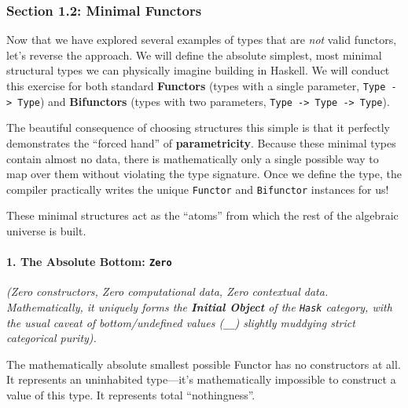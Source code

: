 \documentclass[
]{article}
\begin{document}
\subsubsection{Section 1.2: Minimal
Functors}\label{section-1.2-minimal-functors}

Now that we have explored several examples of types that are \emph{not}
valid functors, let's reverse the approach. We will define the absolute
simplest, most minimal structural types we can physically imagine
building in Haskell. We will conduct this exercise for both standard
\textbf{Functors} (types with a single parameter,
\texttt{Type\ -\textgreater{}\ Type}) and \textbf{Bifunctors} (types
with two parameters,
\texttt{Type\ -\textgreater{}\ Type\ -\textgreater{}\ Type}).

The beautiful consequence of choosing structures this simple is that it
perfectly demonstrates the ``forced hand'' of \textbf{parametricity}.
Because these minimal types contain almost no data, there is
mathematically only a single possible way to map over them without
violating the type signature. Once we define the type, the compiler
practically writes the unique \texttt{Functor} and \texttt{Bifunctor}
instances for us!

These minimal structures act as the ``atoms'' from which the rest of the
algebraic universe is built.

\paragraph{\texorpdfstring{1. The Absolute Bottom:
\texttt{Zero}}{1. The Absolute Bottom: Zero}}\label{the-absolute-bottom-zero}

\emph{(Zero constructors, Zero computational data, Zero contextual data.
Mathematically, it uniquely forms the \textbf{Initial Object} of the
\texttt{Hask} category, with the usual caveat of bottom/undefined values
(\texttt{\_\textbar{}\_}) slightly muddying strict categorical purity).}

The mathematically absolute smallest possible Functor has no
constructors at all. It represents an uninhabited type---it's
mathematically impossible to construct a value of this type. It
represents total ``nothingness''.
\end{document}
